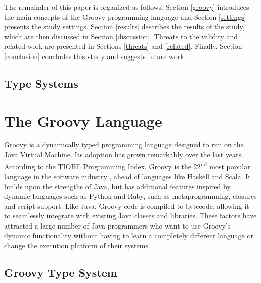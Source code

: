 \documentclass[msc]{ppgccufmg}
\begin{document}

The remainder of this paper is organized as follows. 
Section \ref{groovy} introduces the main concepts of the Groovy programming language and Section \ref{settings} presents the study settings.
Section \ref{results} describes the results of the study, which are then discussed in Section \ref{discussion}.
Threats to the validity and related work are presented in Sections \ref{threats} and \ref{related}.
Finally, Section \ref{conclusion} concludes this study and suggests future work.



\section{Type Systems}

\chapter{The Groovy Language}
Groovy is a dynamically typed programming language designed to run on the Java Virtual Machine.
Its adoption has grown remarkably over the last years.
According to the TIOBE Programming Index, Groovy is the 22\textsuperscript{nd} most popular language in the software industry \cite{tiobe}, ahead of languages like Haskell and Scala. 
It builds upon the strengths of Java, but has additional features inspired by dynamic languages such as Python and Ruby, such as metaprogramming, closures and script support.
Like Java, Groovy code is compiled to bytecode, allowing it to seamlessly integrate with existing Java classes and libraries. 
These factors have attracted a large number of Java programmers who want to use Groovy's dynamic functionality without having to learn a completely different language or change the execution platform of their systems. 

\section{Groovy Type System}
\end{document}
